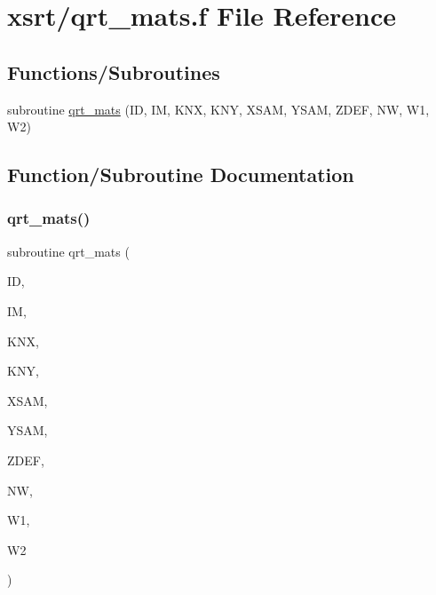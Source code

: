 \hypertarget{qrt__mats_8f}{}\section{xsrt/qrt\+\_\+mats.f File Reference}
\label{qrt__mats_8f}
\subsection*{Functions/\+Subroutines}
\begin{DoxyCompactItemize}
\item 
subroutine \hyperlink{qrt__mats_8f_aa443f008a3c6ebbde9f0c28e6fd2f37b}{qrt\+\_\+mats} (ID, IM, K\+NX, K\+NY, X\+S\+AM, Y\+S\+AM, Z\+D\+EF, NW, W1, W2)
\end{DoxyCompactItemize}


\subsection{Function/\+Subroutine Documentation}
\mbox{\label{qrt__mats_8f_aa443f008a3c6ebbde9f0c28e6fd2f37b}} 
\subsubsection{\texorpdfstring{qrt\+\_\+mats()}{qrt\_mats()}}
{\footnotesize\ttfamily subroutine qrt\+\_\+mats (\begin{DoxyParamCaption}\item[{integer}]{ID,  }\item[{integer}]{IM,  }\item[{integer}]{K\+NX,  }\item[{integer}]{K\+NY,  }\item[{double precision, dimension(knx)}]{X\+S\+AM,  }\item[{double precision, dimension(kny)}]{Y\+S\+AM,  }\item[{double precision, dimension(knx,kny)}]{Z\+D\+EF,  }\item[{integer}]{NW,  }\item[{double precision, dimension(nw)}]{W1,  }\item[{double precision, dimension(nw)}]{W2 }\end{DoxyParamCaption})}

